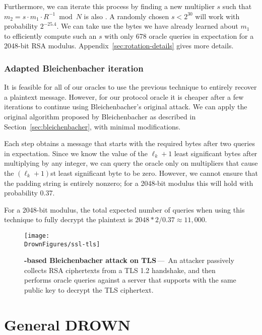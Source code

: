 Furthermore, we can iterate this process by finding a new multiplier $s$ such that $m_2 = s \cdot m_1 \cdot R^{-1} \bmod N$ is also \sslconform.  A randomly chosen $s < 2^{30}$ will work with probability $2^{-25.4}$.  We can take use the bytes we have already learned about $m_1$ to efficiently compute such an $s$ with only 678 oracle queries in expectation for a 2048-bit RSA modulus.   Appendix~\ref{sec:rotation-details} gives more details.

\subsubsection{Adapted Bleichenbacher iteration}
\label{sec:bb-iteration}
It is feasible for all of our oracles to use the previous technique to entirely recover a plaintext message.  However, for our \ssltwo protocol oracle it is cheaper after a few iterations to continue using Bleichenbacher's original attack.  We can apply the original algorithm proposed by Bleichenbacher as described in Section~\ref{sec:bleichenbacher}\ifext, with minimal modifications\fi.

Each step obtains a message that starts with the required  bytes after two queries in expectation.
Since we know the value of the $\ell_k+1$ least significant bytes after multiplying by any integer, we can query the oracle only on multipliers that cause the $(\ell_k+1)$st least significant byte to be zero.  However, we cannot ensure that the padding string is entirely nonzero; for a 2048-bit modulus this will hold with probability 0.37.

For a 2048-bit modulus, the total expected number of queries when using this technique to fully decrypt the plaintext is $2048 * 2 / 0.37 \approx 11,000$.


\begin{figure}[t]
	\texttt{[image: \\DrownFigures/ssl-tls]} 
	\caption{\textbf{\ssltwo-based Bleichenbacher attack on TLS}\,---\,%
	An attacker passively collects RSA ciphertexts from a TLS 1.2 handshake, and
    then performs oracle queries against a server that supports \ssltwo with the
	same public key to decrypt the TLS ciphertext.
	}
	\label{fig:ssl-tls}
\end{figure}

\section{General DROWN} 
\label{vulnerability}

